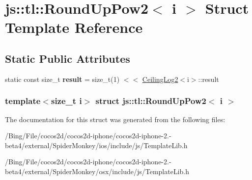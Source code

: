 \hypertarget{structjs_1_1tl_1_1_round_up_pow2}{\section{js\-:\-:tl\-:\-:Round\-Up\-Pow2$<$ i $>$ Struct Template Reference}
\label{structjs_1_1tl_1_1_round_up_pow2}
}
\subsection*{Static Public Attributes}
\begin{DoxyCompactItemize}
\item 
\hypertarget{structjs_1_1tl_1_1_round_up_pow2_a229a62f083533b52d015d2533302602a}{static const size\-\_\-t {\bfseries result} = size\-\_\-t(1) $<$$<$ \hyperlink{structjs_1_1tl_1_1_ceiling_log2}{Ceiling\-Log2}$<$i$>$\-::result}\label{structjs_1_1tl_1_1_round_up_pow2_a229a62f083533b52d015d2533302602a}

\end{DoxyCompactItemize}
\subsubsection*{template$<$size\-\_\-t i$>$ struct js\-::tl\-::\-Round\-Up\-Pow2$<$ i $>$}



The documentation for this struct was generated from the following files\-:\begin{DoxyCompactItemize}
\item 
/\-Bing/\-File/cocos2d/cocos2d-\/iphone/cocos2d-\/iphone-\/2.-\/beta4/external/\-Spider\-Monkey/ios/include/js/Template\-Lib.\-h\item 
/\-Bing/\-File/cocos2d/cocos2d-\/iphone/cocos2d-\/iphone-\/2.-\/beta4/external/\-Spider\-Monkey/osx/include/js/Template\-Lib.\-h\end{DoxyCompactItemize}
